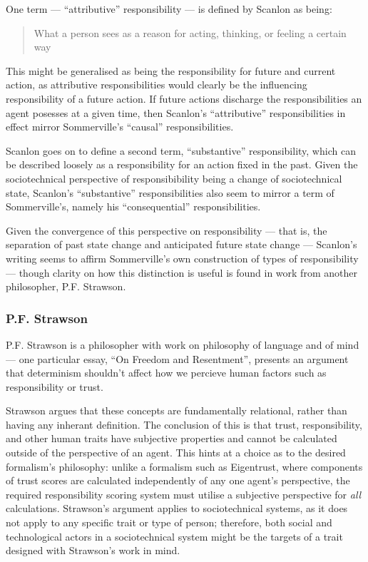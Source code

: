 One term --- ``attributive'' responsibility --- is defined by Scanlon as being:

\begin{quotation}
    What a person sees as a reason for acting, thinking, or feeling a certain way\cite{scanlon2006justice}
\end{quotation}

This might be generalised as being the responsibility for future and current action, as attributive responsibilities would clearly be the influencing responsibility of a future action. If future actions discharge the responsibilities an agent posesses at a given time, then Scanlon's ``attributive'' responsibilities in effect mirror Sommerville's ``causal'' responsibilities.\par

Scanlon goes on to define a second term, ``substantive'' responsibility, which can be described loosely as a responsibility for an action fixed in the past. Given the sociotechnical perspective of responsibibility being a change of sociotechnical state, Scanlon's ``substantive'' responsibilities also seem to mirror a term of Sommerville's, namely his ``consequential'' responsibilities.\par

Given the convergence of this perspective on responsibility --- that is, the separation of past state change and anticipated future state change --- Scanlon's writing seems to affirm Sommerville's own construction of types of responsibility --- though clarity on how this distinction is useful is found in work from another philosopher, P.F. Strawson.

\subsubsection{P.F. Strawson}  %
P.F. Strawson is a philosopher with work on philosophy of language and of mind --- one particular essay, ``On Freedom and Resentment''\cite{strawson}, presents an argument that determinism shouldn't affect how we percieve human factors such as responsibility or trust.\par

Strawson argues that these concepts are fundamentally relational, rather than having any inherant definition. The conclusion of this is that trust, responsibility, and other human traits have subjective properties and cannot be calculated outside of the perspective of an agent. This hints at a choice as to the desired formalism's philosophy: unlike a formalism such as Eigentrust, where components of trust scores are calculated independently of any one agent's perspective, the required responsibility scoring system must utilise a subjective perspective for \emph{all} calculations. Strawson's argument applies to sociotechnical systems, as it does not apply to any specific trait or type of person; therefore, both social and technological actors in a sociotechnical system might be the targets of a trait designed with Strawson's work in mind.\par

